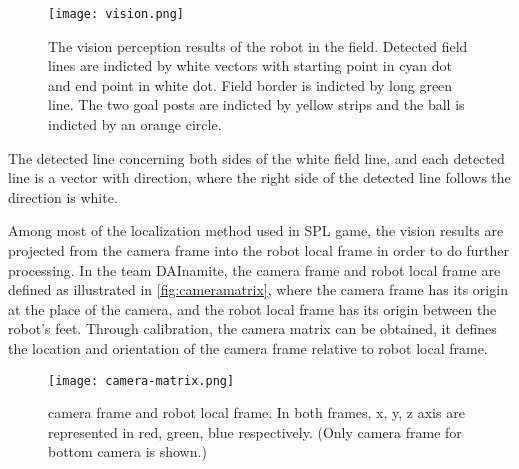 \begin{figure}[h!]
  \centering
  \texttt{[image: vision.png]}
  \caption[The vision perception result of the robot in the field.]{The vision perception results of the robot in the field. Detected field lines are indicted by white vectors with starting point in cyan dot and end point in white dot. Field border is indicted by long green line. The two goal posts are indicted by yellow strips and the ball is indicted by an orange circle.}
  \label{fig:perception}
\end{figure}

The detected line concerning both sides of the white field line, and each detected line is a vector with direction, where the right side of the detected line follows the direction is white.

Among most of the localization method used in \gls{SPL} game, the vision results are projected from the camera frame into the robot local frame in order to do further processing. In the team DAInamite, the camera frame and robot local frame are defined as illustrated in \autoref{fig:cameramatrix}, where the camera frame has its origin at the place of the camera, and the robot local frame has its origin between the robot's feet. Through calibration, the camera matrix can be obtained, it defines the location and orientation of the camera frame relative to robot local frame.
\begin{figure}[h!]
  \centering
  \texttt{[image: camera-matrix.png]}
  \caption[Only camera frame for bottom camera is shown]{camera frame and robot local frame. In both frames, x, y, z axis are represented in red, green, blue respectively. (Only camera frame for bottom camera is shown.)}
  \label{fig:cameramatrix}
\end{figure}

